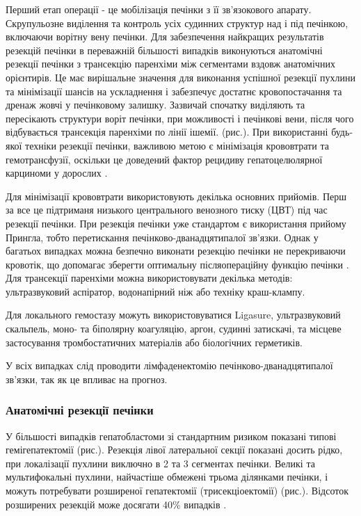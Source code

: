 Перший етап операції - це мобілізація печінки з її зв’язокового апарату. Скрупульозне виділення та контроль усіх судинних структур над і під печінкою, включаючи ворітну вену печінки. Для забезпечення найкращих результатів резекцій печінки в переважній більшості випадків виконуються анатомічні резекції печінки з трансекцію паренхіми між сегментами вздовж анатомічних орієнтирів. Це має вирішальне значення для виконання успішної резекції пухлини та мінімізації шансів на ускладнення і забезпечує достатнє кровопостачання та дренаж жовчі у печінковому залишку. Зазвичай спочатку виділяють та пересікають структури воріт печінки, при можливості і печінкові вени, після чого відбувається трансекція паренхіми по лінії ішемії. (рис.). При використанні будь-якої техніки резекції печінки, важливою метою є мінімізація крововтрати та гемотрансфузії, оскільки це доведений фактор рецидиву гепатоцелюлярної карциноми у дорослих \cite{pmid32843604}. 

Для мінімізації крововтрати використовують декілька основних прийомів. Перш за все це підтриманя низького центрального венозного тиску (ЦВТ) під час резекції печінки. При резекція печінки уже стандартом є використання прийому Прингла, тобто перетискання печінково-дванадцятипалої зв’язки. Однак у багатьох випадках можна безпечно виконати резекцію печінки не перекриваючи кровотік, що допомагає зберегти оптимальну післяопераційну функцію печінки \cite{pmid33210501}. Для трансекції паренхіми можна використовувати декілька методів: ультразвуковий аспіратор, водонапірний ніж або техніку краш-клампу.

Для локального гемостазу можуть використовуватися Ligasure, ультразвуковий скальпель, моно- та біполярну коагуляцію, аргон, судинні затискачі, та місцеве застосування тромбостатичних матеріалів або біологічних герметиків. 

У всіх випадках слід проводити лімфаденектомію печінково-дванадцятипалої зв’язки, так як це впливає на прогноз. 

\subsubsection{Анатомічні резекції печінки}
У більшості випадків гепатобластоми зі стандартним ризиком показані типові гемігепатектомії (рис.). Резекція лівої латеральної секції показані досить рідко, при локалізації пухлини виключно в 2 та 3 сегментах печінки. Великі та мультифокальні пухлини, найчастіше обмежені трьома ділянками печінки, і можуть потребувати розширеної гепатектомії (трисекціоектомії) (рис.). Відсоток розширених резекцій може досягати 40\% випадків \cite{pmid33224825}. 

